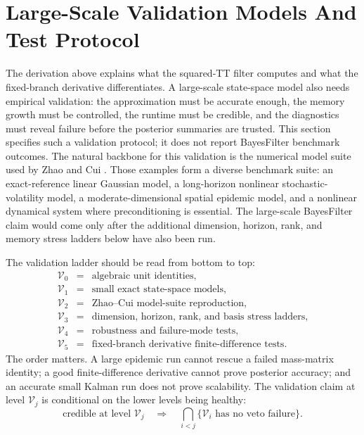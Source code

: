\documentclass[11pt]{article}
\numberwithin{equation}{section}
\begin{document}
\section{Large-Scale Validation Models And Test Protocol}

The derivation above explains what the squared-TT filter computes and what the
fixed-branch derivative differentiates.  A large-scale state-space model also
needs empirical validation: the approximation must be accurate enough, the
memory growth must be controlled, the runtime must be credible, and the
diagnostics must reveal failure before the posterior summaries are trusted.
This section specifies such a validation protocol; it does not report
BayesFilter benchmark outcomes.
The natural backbone for this validation is the numerical model suite used by
Zhao and Cui \cite{zhao2024ttsequential}.  Those examples form a diverse
benchmark suite: an exact-reference linear Gaussian model, a long-horizon
nonlinear stochastic-volatility model, a moderate-dimensional spatial epidemic
model, and a nonlinear dynamical system where preconditioning is essential.
The large-scale BayesFilter claim would come only after the additional
dimension, horizon, rank, and memory stress ladders below have also been run.

The validation ladder should be read from bottom to top:
\begin{equation}
\begin{array}{ccl}
\mathcal V_0&=&\text{algebraic unit identities},\\
\mathcal V_1&=&\text{small exact state-space models},\\
\mathcal V_2&=&\text{Zhao--Cui model-suite reproduction},\\
\mathcal V_3&=&\text{dimension, horizon, rank, and basis stress ladders},\\
\mathcal V_4&=&\text{robustness and failure-mode tests},\\
\mathcal V_5&=&\text{fixed-branch derivative finite-difference tests}.
\end{array}
\label{eq:p27-v1}
\end{equation}
The order matters.  A large epidemic run cannot rescue a failed mass-matrix
identity; a good finite-difference derivative cannot prove posterior accuracy;
and an accurate small Kalman run does not prove scalability.  The validation
claim at level \(\mathcal V_j\) is conditional on the lower levels being
healthy:
\begin{equation}
    \text{credible at level }\mathcal V_j
    \quad\Longrightarrow\quad
    \bigcap_{i<j}\{\mathcal V_i\text{ has no veto failure}\}.
    \label{eq:p27-v2}
\end{equation}
\end{document}
